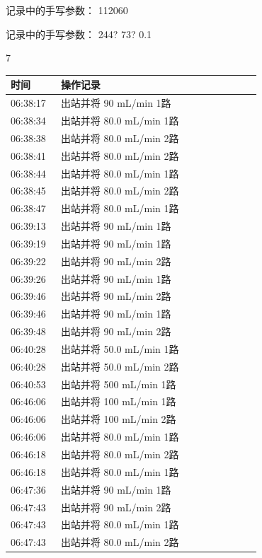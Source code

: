 \documentclass[UTF8,10pt,a4paper,fontset=fandol]{ctexart}
\newcommand{\fieldvalue}[1]{#1}
\newcommand{\handwritten}[1]{#1}
\begin{document}
\vspace{1em}

\noindent
记录中的手写参数：%
\fieldvalue{\handwritten{112060}}

\noindent
记录中的手写参数：%
\fieldvalue{\handwritten{244? 73? 0.1}}


\newpage

\handwritten{7}

\small
\begin{tabular}{p{0.18\linewidth}p{0.72\linewidth}}
\textbf{时间} & \textbf{操作记录}\\ \hline
06:38:17 & 出站并将 90 mL/min 1路\\
06:38:34 & 出站并将 80.0 mL/min 1路\\
06:38:38 & 出站并将 80.0 mL/min 2路\\
06:38:41 & 出站并将 80.0 mL/min 2路\\
06:38:44 & 出站并将 80.0 mL/min 1路\\
06:38:45 & 出站并将 80.0 mL/min 2路\\
06:38:47 & 出站并将 80.0 mL/min 1路\\
06:39:13 & 出站并将 90 mL/min 1路\\
06:39:19 & 出站并将 90 mL/min 1路\\
06:39:22 & 出站并将 90 mL/min 2路\\
06:39:26 & 出站并将 90 mL/min 1路\\
06:39:46 & 出站并将 90 mL/min 2路\\
06:39:46 & 出站并将 90 mL/min 1路\\
06:39:48 & 出站并将 90 mL/min 2路\\
06:40:28 & 出站并将 50.0 mL/min 1路\\
06:40:28 & 出站并将 50.0 mL/min 2路\\
06:40:53 & 出站并将 500 mL/min 1路\\
06:46:06 & 出站并将 100 mL/min 1路\\
06:46:06 & 出站并将 100 mL/min 2路\\
06:46:06 & 出站并将 80.0 mL/min 1路\\
06:46:18 & 出站并将 80.0 mL/min 2路\\
06:46:18 & 出站并将 80.0 mL/min 1路\\
06:47:36 & 出站并将 90 mL/min 1路\\
06:47:43 & 出站并将 90 mL/min 2路\\
06:47:43 & 出站并将 80.0 mL/min 1路\\
06:47:43 & 出站并将 80.0 mL/min 2路\\
\end{tabular}
\end{document}
